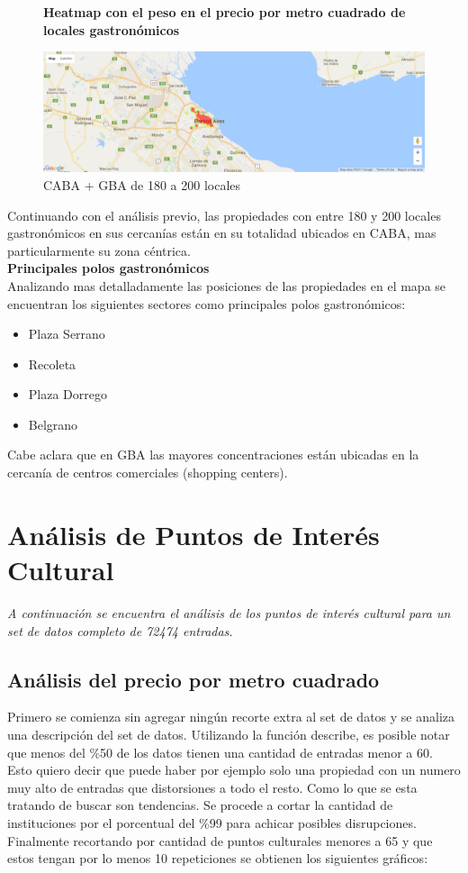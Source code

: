 \documentclass[a4paper, 10pt]{article}
\begin{document}
				\begin{figure}[H][H]
    				\centering
    				\textbf{Heatmap con el peso en el precio por metro cuadrado de locales gastronómicos}\par\medskip
    				\includegraphics[width=\textwidth]{images/22}
    				\caption{CABA + GBA de 180 a 200 locales}
				\end{figure}								
				
				
				Continuando con el análisis previo, las propiedades con entre 180 y 200 
				locales gastronómicos en sus cercanías están en su totalidad ubicados en CABA, 
				mas particularmente su zona céntrica.\\
				
				\textbf{Principales polos gastronómicos}\\
				Analizando mas detalladamente las posiciones de las propiedades 
				en el mapa se encuentran los siguientes sectores como principales polos gastronómicos:
\begin{itemize}
	\item Plaza Serrano
	\item Recoleta
	\item Plaza Dorrego
	\item Belgrano
\end{itemize}


				Cabe aclara que en GBA las mayores concentraciones están ubicadas en la 
				cercanía de centros comerciales (shopping centers).
	
		\section{Análisis de Puntos de Interés Cultural}
			\emph{A continuación se encuentra el análisis de los puntos de interés cultural 
			para un set de datos completo de 72474 entradas.}
			
			\subsection{Análisis del precio por metro cuadrado}
				Primero se comienza sin agregar ningún recorte extra al set de datos y se 
				analiza una descripción del set de datos. Utilizando la función describe, 
				es posible notar que menos del \%50 de los datos tienen una cantidad de 
				entradas menor a 60. Esto quiero decir que puede haber por ejemplo solo 
				una propiedad con un numero muy alto de entradas que distorsiones a todo 
				el resto. Como lo que se esta tratando de buscar son tendencias. 
				Se procede a cortar la cantidad de instituciones por el porcentual del \%99 
				para achicar posibles disrupciones. 
				Finalmente recortando por cantidad de puntos culturales menores a 65 y 
				que estos tengan por lo menos 10 repeticiones se obtienen los siguientes gráficos:
\end{document}
